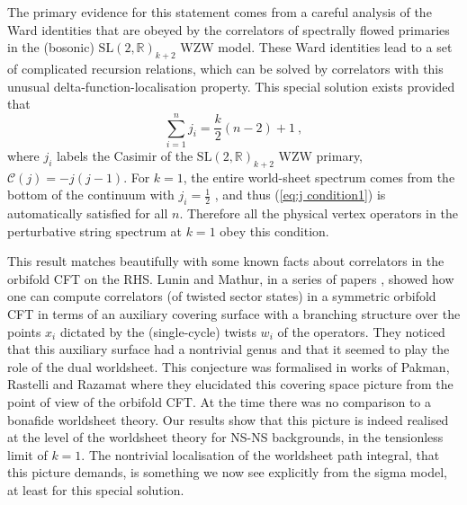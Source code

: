 \documentclass[12pt,a4paper]{article}
\newcommand{\be}{\begin{equation}}
\newcommand{\ee}{\end{equation}}
\begin{document}
The primary evidence for this statement comes from a careful analysis of the Ward identities that are obeyed by the correlators of spectrally flowed primaries in the (bosonic) $\mathrm{SL}(2, \mathds{R})_{k+2}$  WZW model.  These Ward identities lead to a set of complicated recursion relations, which can be solved by correlators with this unusual delta-function-localisation property. This special solution exists provided that 
\be
\sum_{i=1}^n j_i=\frac{k}{2}(n-2)+1\ , \label{eq:j condition1}
\ee
where $j_i$ labels the Casimir of the  $\mathrm{SL}(2, \mathds{R})_{k+2}$  WZW primary, $\mathcal{C}(j)=-j(j-1)$. For $k=1$, the entire world-sheet spectrum comes from the bottom of the continuum with $j_i=\frac{1}{2}$ \cite{Eberhardt:2018ouy}, and thus (\ref{eq:j condition1}) is automatically satisfied for all $n$. Therefore all the physical vertex operators in the perturbative string spectrum at $k=1$ obey this condition. 

This result matches beautifully with some known facts about correlators in the orbifold CFT on the RHS. 
Lunin and Mathur, in a series of papers \cite{Lunin:2000yv,Lunin:2001pw}, showed how one can compute correlators (of twisted sector states) in a symmetric orbifold CFT in terms of an auxiliary covering surface with a branching structure over the points $x_i$ dictated by the (single-cycle) twists $w_i$ of the operators. They noticed that this auxiliary surface had a nontrivial genus and that it seemed to play the role of the dual worldsheet. This conjecture was formalised in works of Pakman, Rastelli and Razamat \cite{Pakman:2009zz,Pakman:2009ab} where they elucidated this covering space picture from the point of view of the orbifold CFT. At the time there was no comparison to a bonafide worldsheet theory. Our results show that this picture is indeed realised at the level of the worldsheet theory for NS-NS backgrounds, in the tensionless limit of $k=1$. The nontrivial localisation of the worldsheet path integral, that this picture demands, is something we now see explicitly from the sigma model, at least for this special solution. 
\end{document}
